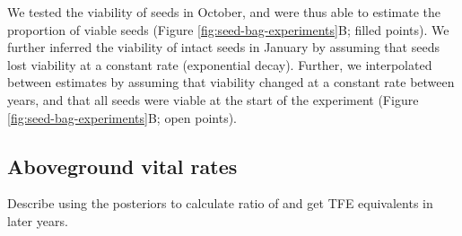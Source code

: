 \documentclass[12pt, oneside, titlepage]{article}   	%
\begin{document}
We tested the viability of seeds in October, and were thus able to estimate the proportion of viable seeds (Figure \ref{fig:seed-bag-experiments}B; filled points). We further inferred the viability of intact seeds in January by assuming that seeds lost viability at a constant rate (exponential decay). Further, we interpolated between estimates by assuming that viability changed at a constant rate between years, and that all seeds were viable at the start of the experiment (Figure \ref{fig:seed-bag-experiments}B; open points).

\subsection{Aboveground vital rates}

Describe using the posteriors to calculate ratio of and get TFE equivalents in later years. 

\clearpage
\newpage




\clearpage
 

\end{document}

